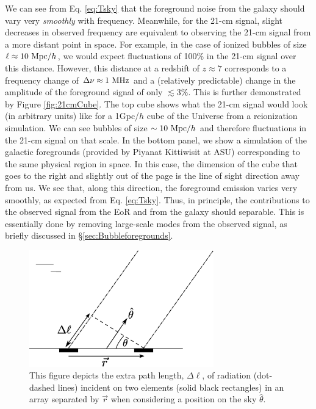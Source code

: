 We can see from Eq. \ref{eq:Tsky} that the foreground noise from the galaxy should vary very \textit{smoothly} with frequency. Meanwhile, for the 21-cm signal, slight decreases in observed frequency are equivalent to observing the 21-cm signal from a more distant point in space. For example, in the case of ionized bubbles of size $\ell \approx 10\ \text{Mpc/$h$}$, we would expect fluctuations of 100\% in the 21-cm signal over this distance. However, this distance at a redshift of $z \approx 7$ corresponds to a frequency change of $\Delta \nu \approx 1\ \text{MHz}$ and a  (relatively predictable) change in the amplitude of the foreground signal of only $\lesssim3\%$. This is further demonstrated by Figure \ref{fig:21cmCube}. The top cube shows what the 21-cm signal would look (in arbitrary units) like for a 1Gpc/$h$ cube of the Universe from a reionization simulation. We can see bubbles of size $\sim10\ \text{Mpc/$h$}$ and therefore fluctuations in the 21-cm signal on that scale. In the bottom panel, we show a simulation of the galactic foregrounds (provided by Piyanat Kittiwisit at ASU) corresponding to the same physical region in space. In this case, the dimension of the cube that goes to the right and slightly out of the page is the line of sight direction away from us. We see that, along this direction, the foreground emission varies very smoothly, as expected from Eq. \ref{eq:Tsky}. Thus, in principle, the contributions to the observed signal from the EoR and from the galaxy should separable. This is essentially done by removing large-scale modes from the observed signal, as briefly discussed in \S \ref{sec:Bubbleforegrounds}.



\begin{figure}[!p]
  \centering
  \includegraphics[width=8cm]{interferometry.eps}
  \caption{This figure depicts the extra path length, $\Delta \ell$, of radiation (dot-dashed lines) incident on two elements (solid black rectangles) in an array separated by $\vec{r}$ when considering a position on the sky $\hat{\theta}$.}
  \label{fig:interferometry}
\end{figure}


